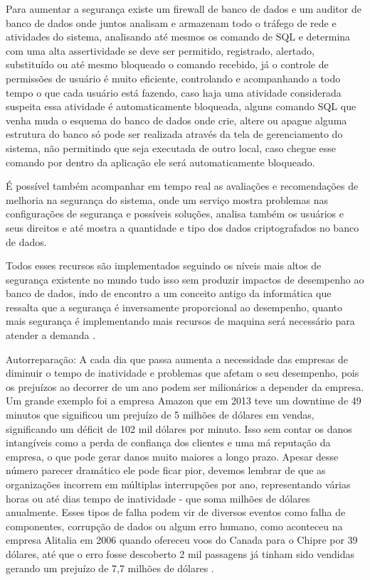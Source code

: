 \begin{alineas}
	Para aumentar a segurança existe um firewall de banco de dados  e um auditor de banco de dados onde juntos analisam e armazenam todo o tráfego de rede e atividades do sistema, analisando até mesmos os comando de SQL e determina com uma alta assertividade se deve ser permitido, registrado, alertado, substituído ou até mesmo bloqueado o comando recebido, já o controle de permissões de usuário é muito eficiente, controlando e acompanhando a todo tempo o que cada usuário está fazendo, caso haja uma atividade considerada suspeita essa atividade é automaticamente bloqueada, alguns comando SQL que venha muda o esquema do banco de dados onde crie, altere ou apague alguma estrutura do banco só pode ser realizada através da tela de gerenciamento do sistema, não permitindo que seja executada de outro local, caso chegue esse comando por dentro da aplicação ele será automaticamente bloqueado.
	
	É possível também acompanhar em tempo real as avaliações e recomendações de melhoria na segurança do sistema, onde um serviço mostra problemas nas configurações de segurança e possíveis soluções, analisa também os usuários e seus direitos e até mostra a quantidade e tipo dos dados criptografados no banco de dados.
	
	Todos esses recursos são implementados seguindo os níveis mais altos de segurança existente no mundo tudo isso sem produzir impactos de desempenho ao banco de dados, indo de encontro a um conceito antigo da informática que ressalta que a segurança é inversamente proporcional ao desempenho, quanto mais segurança é implementando mais recursos de maquina será necessário para atender a demanda \cite{OracleDefesa}.
	
	
\item Autorreparação: A cada dia que passa aumenta a necessidade das empresas de diminuir o tempo de inatividade e problemas que afetam o seu desempenho, pois os prejuízos ao decorrer de um ano podem ser milionários a depender da empresa. Um grande exemplo foi a empresa Amazon que em 2013 teve um downtime de 49 minutos que significou um prejuízo de 5 milhões de dólares em vendas, significando um déficit de 102 mil dólares por minuto. Isso sem contar os danos intangíveis como a perda de confiança dos clientes e uma má reputação da empresa, o que pode gerar danos muito maiores a longo prazo. Apesar desse número parecer dramático ele pode ficar pior, devemos lembrar de que as organizações incorrem em múltiplas interrupções por ano, representando várias horas ou até dias tempo de inatividade - que soma milhões de dólares anualmente. Esses tipos de falha podem vir de diversos eventos como falha de componentes, corrupção de dados ou algum erro humano, como aconteceu na empresa Alitalia em 2006 quando ofereceu voos do Canada para o Chipre por 39 dólares, até que o erro fosse descoberto 2 mil passagens já tinham sido vendidas gerando um prejuízo de 7,7 milhões de dólares \cite{Trapalhada}.


\end{alineas}
